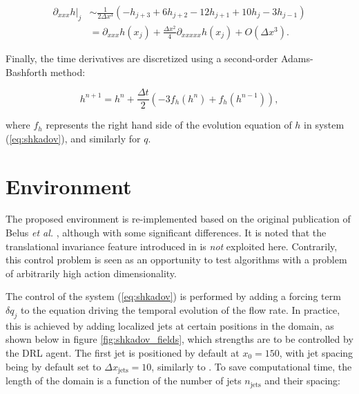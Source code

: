 \begin{equation}
\label{eq:shkadov_fd}
\begin{split}
	\left. \partial_{xxx} h \right|_j 	&\sim \frac{1}{2 \Delta x^3} \left( -h_{j+3} + 6h_{j+2} - 12h_{j+1} + 10 h_j - 3 h_{j-1} \right) \\
							&= \partial_{xxx} h (x_j) + \frac{\Delta x^2}{4} \partial_{xxxxx} h (x_j) + O\left( \Delta x^3 \right).
\end{split}
\end{equation}

Finally, the time derivatives are discretized using a second-order Adams-Bashforth method:

\begin{equation}
\label{eq:adams_bashforth}
	h^{n+1} = h^n + \frac{\Delta t}{2} \left( - 3 f_h \left(h^{n} \right) + f_h \left(h^{n-1} \right) \right),
\end{equation}

\noindent where $f_h$ represents the right hand side of the evolution equation of $h$ in system (\ref{eq:shkadov}), and similarly for $q$.

\section{Environment}

The proposed environment is re-implemented based on the original publication of Belus \textit{et al.} \cite{belus2019}, although with some significant differences. It is noted that the translational invariance feature introduced in \cite{belus2019} is \emph{not} exploited here. Contrarily, this control problem is seen as an opportunity to test algorithms with a problem of arbitrarily high action dimensionality.

The control of the system (\ref{eq:shkadov}) is performed by adding a forcing term $\delta q_j$ to the equation driving the temporal evolution of the flow rate. In practice, this is achieved by adding localized jets at certain positions in the domain, as shown below in figure \ref{fig:shkadov_fields}, which strengths are to be controlled by the DRL agent. The first jet is positioned by default at $x_0=150$, with jet spacing being by default set to $\Delta x_\text{jets} = 10$, similarly to \cite{belus2019}. To save computational time, the length of the domain is a function of the number of jets $n_\text{jets}$ and their spacing:

